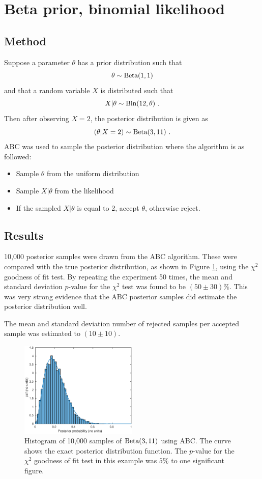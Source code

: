 \documentclass[a4paper]{proc}
\begin{document}
\section{Beta prior, binomial likelihood}
\subsection{Method}
Suppose a parameter $\theta$ has a prior distribution such that
\begin{equation}
\theta\sim\textup{Beta}(1,1)
\end{equation}
and that a random variable $X$ is distributed such that
\begin{equation}
X|\theta\sim\textup{Bin}(12,\theta) \ .
\end{equation}
Then after observing $X=2$, the posterior distribution is given as
\begin{equation}
(\theta|X=2)\sim\textup{Beta}(3,11) \ .
\end{equation}
ABC was used to sample the posterior distribution where the algorithm is as followed:
\begin{itemize}
  \item Sample $\theta$ from the uniform distribution
  \item Sample $X|\theta$ from the likelihood
  \item If the sampled $X|\theta$ is equal to 2, accept $\theta$, otherwise reject.
\end{itemize}

\subsection{Results}
10,000 posterior samples were drawn from the ABC algorithm. These were compared with the true posterior distribution, as shown in Figure \ref{binomial}, using the $\chi^2$ goodness of fit test.  By repeating the experiment 50 times, the mean and standard deviation $p$-value for the $\chi^2$ test was found to be $(50\pm30)\%$. This was very strong evidence that the ABC posterior samples did estimate the posterior distribution well.

The mean and standard deviation number of rejected samples per accepted sample was estimated to $(10\pm10)$.

\begin{figure}
\includegraphics[width=0.5\textwidth]{binomial_ABC0528.eps}
\caption{Histogram of 10,000 samples of $\textup{Beta}(3,11)$ using ABC. The curve shows the exact posterior distribution function. The $p$-value for the $\chi^2$ goodness of fit test in this example was $5\%$ to one significant figure.}
\label{binomial}
\end{figure}
\end{document}
